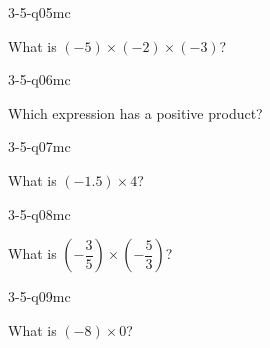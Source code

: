 \begin{practiceQuestion}{3-5-q05}{mc}
\begin{questionText}
What is $(-5) \times (-2) \times (-3)$?
\end{questionText}
\end{practiceQuestion}

\begin{practiceQuestion}{3-5-q06}{mc}
\begin{questionText}
Which expression has a positive product?
\end{questionText}
\end{practiceQuestion}

\begin{practiceQuestion}{3-5-q07}{mc}
\begin{questionText}
What is $(-1.5) \times 4$?
\end{questionText}
\end{practiceQuestion}

\begin{practiceQuestion}{3-5-q08}{mc}
\begin{questionText}
What is $\left(-\dfrac{3}{5}\right) \times \left(-\dfrac{5}{3}\right)$?
\end{questionText}
\end{practiceQuestion}

\begin{practiceQuestion}{3-5-q09}{mc}
\begin{questionText}
What is $(-8) \times 0$?
\end{questionText}
\end{practiceQuestion}

